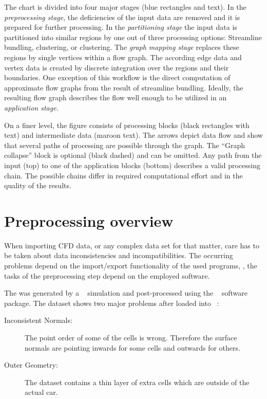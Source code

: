 The chart is divided into four major stages (blue rectangles and text).
In the \emph{preprocessing stage}, the deficiencies of the input data are removed and it is prepared for further processing.
In the \emph{partitioning stage} the input data is partitioned into similar regions by one out of three processing options: Streamline bundling,  clustering, or \kMeans clustering.
The \emph{graph mapping stage} replaces these regions by single vertices within a flow graph. The according edge data and vertex data is created by discrete integration over the regions and their boundaries. One exception of this workflow is the direct computation of approximate flow graphs from the result of streamline bundling.
Ideally, the resulting flow graph describes the flow well enough to be utilized in an \emph{application stage}.

On a finer level, the figure consists of processing blocks (black rectangles with text) and intermediate data (maroon text).
The arrows depict data flow and show that several paths of processing are possible through the graph. The ``Graph collapse'' block is optional (black dashed) and can be omitted. Any path from the input (top) to one of the application blocks (bottom) describes a valid processing chain. The possible chains differ in required computational effort and in the quality of the results.


\section{Preprocessing overview}
\label{sec:theory:preprocessing}

When importing \ac{CFD} data, or any complex data set for that matter, care has to be taken about data inconsistencies and incompatibilities. The occurring problems depend on the import\slash export functionality of the used programs, \ie, the tasks of the preprocessing step depend on the employed software.

The \toyotadataset was generated by a ~\cite{AnsysFluent} simulation and post-processed using the ~\cite{EnSight} software package.
The dataset shows two major problems after loaded into \vtk~\cite{VTK}:
%
\begin{description}
%
  \item[Inconsistent Normals:] The point order of some of the cells is wrong. Therefore the surface normals are pointing inwards for some cells and outwards for others.
%
  \item[Outer Geometry:] The dataset contains a thin layer of extra cells which are outside of the actual car.
%
\end{description}

